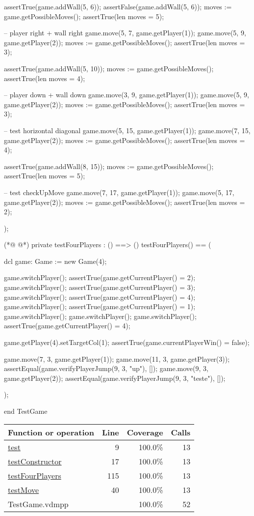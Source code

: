 \begin{vdmpp}[breaklines=true]
  assertTrue(game.addWall(5, 6));
  assertFalse(game.addWall(5, 6));
  moves := game.getPossibleMoves();
  assertTrue(len moves = 5);
  
  -- player right + wall right
  game.move(5, 7, game.getPlayer(1));
  game.move(5, 9, game.getPlayer(2));
  moves := game.getPossibleMoves();
  assertTrue(len moves = 3);
  
  assertTrue(game.addWall(5, 10));
  moves := game.getPossibleMoves();
  assertTrue(len moves = 4);
  
  -- player down + wall down
  game.move(3, 9, game.getPlayer(1));
  game.move(5, 9, game.getPlayer(2));
  moves := game.getPossibleMoves();
  assertTrue(len moves = 3);
  
  -- test horizontal diagonal
  game.move(5, 15, game.getPlayer(1));
  game.move(7, 15, game.getPlayer(2));
  moves := game.getPossibleMoves();
  assertTrue(len moves = 4);
  
  assertTrue(game.addWall(8, 15));
  moves := game.getPossibleMoves();
  assertTrue(len moves = 5);
  
  -- test checkUpMove
  game.move(7, 17, game.getPlayer(1));
  game.move(5, 17, game.getPlayer(2));
  moves := game.getPossibleMoves();
  assertTrue(len moves = 2);
  
 );
 
(*@
\label{testFourPlayers:115}
@*)
 private testFourPlayers : () ==> ()
 testFourPlayers() ==
 (
 
  dcl
  game: Game := new Game(4);
  
  game.switchPlayer();
  assertTrue(game.getCurrentPlayer() = 2);
  game.switchPlayer();
  assertTrue(game.getCurrentPlayer() = 3);
  game.switchPlayer();
  assertTrue(game.getCurrentPlayer() = 4);
  game.switchPlayer();
  assertTrue(game.getCurrentPlayer() = 1);
  game.switchPlayer();
  game.switchPlayer();
  game.switchPlayer();
  assertTrue(game.getCurrentPlayer() = 4);
  
  game.getPlayer(4).setTargetCol(1);
  assertTrue(game.currentPlayerWin() = false);
  
  game.move(7, 3, game.getPlayer(1));
  game.move(11, 3, game.getPlayer(3));
  assertEqual(game.verifyPlayerJump(9, 3, "up"), []);
  game.move(9, 3, game.getPlayer(2));
  assertEqual(game.verifyPlayerJump(9, 3, "teste"), []);
 
 );
 
end TestGame
\end{vdmpp}
\bigskip
\begin{longtable}{|l|r|r|r|}
\hline
Function or operation & Line & Coverage & Calls \\
\hline
\hline
\hyperref[test:9]{test} & 9&100.0\% & 13 \\
\hline
\hyperref[testConstructor:17]{testConstructor} & 17&100.0\% & 13 \\
\hline
\hyperref[testFourPlayers:115]{testFourPlayers} & 115&100.0\% & 13 \\
\hline
\hyperref[testMove:40]{testMove} & 40&100.0\% & 13 \\
\hline
\hline
TestGame.vdmpp & & 100.0\% & 52 \\
\hline
\end{longtable}

